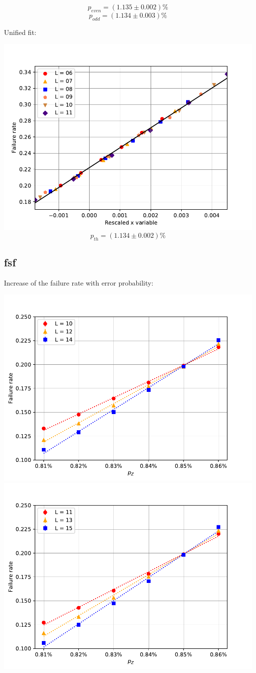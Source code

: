 \documentclass[pra]{revtex4-1}
\begin{document}
\[  p_{even} = (1.135 \pm 0.002)\% \]
\[  p_{odd} = (1.134 \pm 0.003)\% \]
\clearpage 

Unified fit: \begin{center} 

\includegraphics[width=.9\textwidth]{../graphs-paper2/ete-dephasing-rescaled.pdf}
\[  p_{th} = (1.134 \pm 0.002)\% \] \end{center}
\clearpage 

\subsection*{fsf}
\noindent Increase of the failure rate with error probability: 
  
\includegraphics[width=.49\textwidth]{../graphs-paper2/fsf-dephasing-even.pdf}
\includegraphics[width=.49\textwidth]{../graphs-paper2/fsf-dephasing-odd.pdf}
\end{document}
